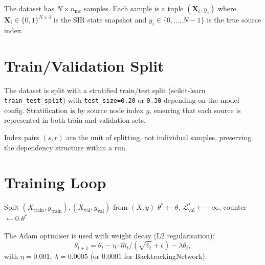 \documentclass[12pt,a4paper]{report}
\begin{document}
The dataset has $N \times n_{\text{mc}}$ samples. Each sample is a tuple
$(\mathbf{X}_i, y_i)$ where $\mathbf{X}_i \in \{0,1\}^{N \times 3}$ is the
SIR state snapshot and $y_i \in \{0,\ldots,N-1\}$ is the true source index.

\section{Train/Validation Split}

The dataset is split with a stratified train/test split (scikit-learn
\texttt{train\_test\_split}) with \texttt{test\_size=0.20} or \texttt{0.30}
depending on the model config. Stratification is by source node index $y$,
ensuring that each source is represented in both train and validation sets.

Index pairs $(s, r)$ are the unit of splitting, not individual samples,
preserving the dependency structure within a run.

\section{Training Loop}

\begin{algorithm}[H]
\caption{Training Loop with Early Stopping}
\SetAlgoLined
{}
Split $(X_{\text{train}}, y_{\text{train}}), (X_{\text{val}}, y_{\text{val}})$ from $(X, y)$\;
$\theta^* \leftarrow \theta$, $\mathcal{L}^*_{\text{val}} \leftarrow +\infty$, counter $\leftarrow 0$\;
\Return $\theta^*$\;
\end{algorithm}

The Adam optimiser is used with weight decay (L2 regularisation):
\begin{equation}
  \theta_{t+1} = \theta_t - \eta \cdot \hat{m}_t / (\sqrt{\hat{v}_t} + \epsilon) - \lambda \theta_t,
\end{equation}
with $\eta = 0.001$, $\lambda = 0.0005$ (or $0.0001$ for BacktrackingNetwork).
\end{document}
